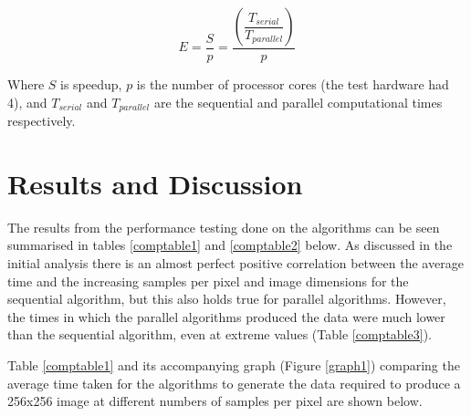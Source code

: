 \documentclass[12pt,journal,transmag]{IEEEtran}
\begin{document}
	\begin{equation} \label{efficiencyeq} 
	E = \dfrac{S}{p} = \dfrac{(\dfrac{T_{serial}}{T_{parallel}})}{p}
	\end{equation}
	
	Where $S$ is speedup, $p$ is the number of processor cores (the test hardware had 4), and $T_{serial}$ and $T_{parallel}$ are the sequential and parallel computational times respectively.
	
	\section{Results and Discussion}
	The results from the performance testing done on the algorithms can be seen summarised in tables \ref{comptable1} and \ref{comptable2} below. As discussed in the initial analysis there is an almost perfect positive correlation between the average time and the increasing samples per pixel and image dimensions for the sequential algorithm, but this also holds true for parallel algorithms. However, the times in which the parallel algorithms produced the data were much lower than the sequential algorithm, even at extreme values (Table \ref{comptable3}).
	
	Table \ref{comptable1} and its accompanying graph (Figure \ref{graph1}) comparing the average time taken for the algorithms to generate the data required to produce a 256x256 image at different numbers of samples per pixel are shown below.
	
	\begin{table}[!h]
		\caption{256x256 Image Generation Performance Comparison}
		\label{comptable1}
		\centering
	\end{table}
	
\end{document}
